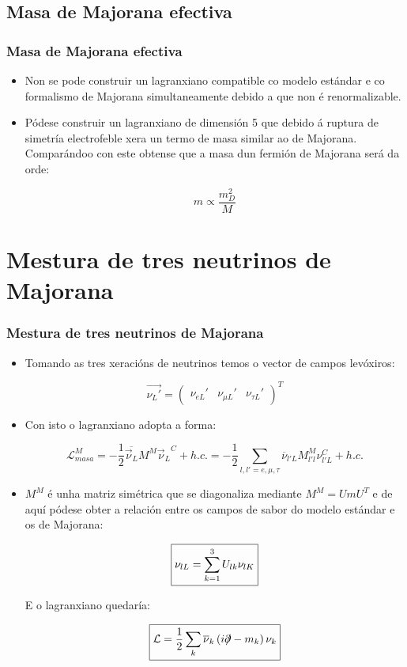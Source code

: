 \documentclass[10pt]{beamer}
\newcommand{\beq}{\begin{equation}}
\newcommand{\eeq}{\end{equation}}
\newcommand{\bi}{\begin{itemize}}
\newcommand{\ei}{\end{itemize}}
\newcommand{\bbx}{\begin{boxed}}
\newcommand{\ebx}{\end{boxed}}
\newcommand{\bmx}{\left(\begin{array}}
\newcommand{\emx}{\end{array}\right)}
\newcommand{\barra}[1]{\overline{#1}}
\newcommand{\rvec}[1]{\overrightarrow{#1}}
\newcommand{\chula}[1]{\mathcal{#1}}
\newcommand{\slx}[1]{ #1\!\!\!/ }
\begin{document}
\subsection{Masa de Majorana efectiva}

\begin{frame} \frametitle{Masa de Majorana efectiva}
\bi

\item Non se pode construir un lagranxiano compatible co modelo estándar e co formalismo de Majorana simultaneamente debido a que non é renormalizable.

\item Pódese construir un lagranxiano de dimensión 5 que debido á ruptura de simetría electrofeble xera un termo de masa similar ao de Majorana. Comparándoo con este obtense que a masa dun fermión de Majorana será da orde:

\beq
m \propto \frac{m_D^2}{M} \nonumber
\eeq

\ei
\end{frame}

\section{Mestura de tres neutrinos de Majorana}

\begin{frame}[allowframebreaks] \frametitle{Mestura de tres neutrinos de Majorana}
\bi

\item Tomando as tres xeracións de neutrinos temos o vector de campos levóxiros:

\beq
\rvec{\nu_L'} = \bmx{ccc} \nu_{eL}' & \nu_{\mu L}' & \nu_{\tau L}' \emx^T \nonumber
\eeq

\item Con isto o lagranxiano adopta a forma:

\beq
\chula L_{masa}^M= -\frac{1}{2} \barra{\rvec\nu_L} M^M {\rvec\nu_L}^C +h.c. = -\frac{1}{2} \sum_{l,l' = e,\mu,\tau} \barra\nu_{l'L} M_{l'l}^M \nu_{l' L}^C + h.c. \nonumber
\eeq

\item $M^M$ é unha matriz simétrica que se diagonaliza mediante $M^M = U m U^T$ e de aquí pódese obter a relación entre os campos de sabor do modelo estándar e os de Majorana:

\beq
\bbx{
\nu_{lL} = \sum_{k=1}^3 U_{lk} \nu_{lK}
}\ebx \nonumber
\eeq

E o lagranxiano quedaría:

\beq
\bbx{
\chula L = \frac{1}{2} \sum_k \barra\nu_k \left( i\slx\partial - m_k \right) \nu_k \nonumber
}\ebx
\eeq

\ei
\end{frame}
\end{document}
